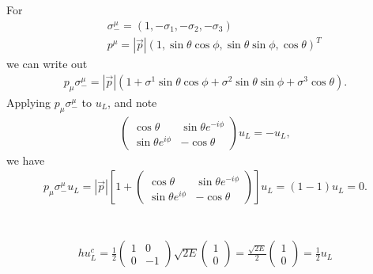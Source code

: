 \documentclass[11pt]{article}
\begin{document}
\section{ }
For
\begin{eqnarray}
   && \sigma_-^\mu = (1, -\sigma_1, -\sigma_2, -\sigma_3) \\
   &&p^\mu
  = |\vec {p}| (1, \sin\theta\cos\phi, \sin\theta\sin\phi, \cos\theta)^T
\end{eqnarray}
we can write out
\begin{eqnarray}
    p_\mu\sigma_-^\mu = |{\vec p}| (1+ \sigma^1 \sin\theta\cos\phi +\sigma^2\sin\theta\sin\phi + \sigma^3 \cos\theta).
\end{eqnarray}
Applying $p_\mu\sigma_-^\mu$ to $u_L$, and note
\begin{eqnarray}
    \begin{pmatrix}
        \cos\theta & \sin\theta e^{-i\phi} \\ 
        \sin\theta e^{i\phi} & -\cos\theta
    \end{pmatrix}
    u_L=-u_L,
\end{eqnarray}
we have
\begin{eqnarray}
    p_\mu\sigma_-^\mu u_L = |{\vec p}| \left[ 1+
    \begin{pmatrix}
        \cos\theta & \sin\theta e^{-i\phi} \\ 
        \sin\theta e^{i\phi} & -\cos\theta
    \end{pmatrix}
        \right] u_L =(1-1)u_L=0.
\end{eqnarray}

\section{ }
\begin{eqnarray}
    hu_L^c=\frac{1}{2} 
    \begin{pmatrix}
        1 & 0 \\
        0 & -1
    \end{pmatrix}
    \sqrt{2E}
    \begin{pmatrix}
        1 \\ 0 
    \end{pmatrix}
    = \frac{\sqrt{2E}}{2}
        \begin{pmatrix}
            1 \\ 0 
        \end{pmatrix}
    =\frac{1}{2}u_L
\end{eqnarray}
\end{document}
